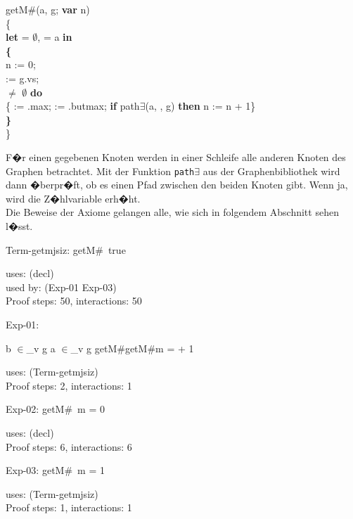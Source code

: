 \medskip

getM\#(a, g; {\bf var} n) \\
\{\\
{\bf let}  = $\emptyset$,  = a {\bf in}\\
{\bf \{}\\
\tabbe n := 0;\\
\tabbe {} := g.vs;\\
  $\neq$ $\emptyset$ {\bf do}\\
\tabbe {} \{ := .max;  := .butmax; {\bf if} path$\exists$(a, , g) {\bf then} n := n + 1\}\\
{\bf \}}\\
\}

F�r einen gegebenen Knoten werden in einer Schleife alle anderen Knoten des Graphen betrachtet. Mit der Funktion \texttt{path$\exists$} aus der Graphenbibliothek wird dann �berpr�ft, ob es einen Pfad zwischen den beiden Knoten gibt. Wenn ja, wird die Z�hlvariable erh�ht. \\
Die Beweise der Axiome gelangen alle, wie sich in folgendem Abschnitt sehen l�sst. 
\medskip

Term-getmjsiz: 
 \Fol \Do getM\#\Dc\ true


uses: (decl)\\
used by: (Exp-01 Exp-03)\\
Proof steps: 50, interactions: 50

\medskip

Exp-01: 
\begin{flushleft}


\Fol

\Not b $\in$\_v g \And a $\in$\_v g \Imp \Do getM\#\Dc \Do getM\#\Dc m =  + 1

\end{flushleft}


uses: (Term-getmjsiz)\\
Proof steps: 2, interactions: 1

\medskip

Exp-02: 
 \Fol \Do getM\#\Dc\ m = 0


uses: (decl)\\
Proof steps: 6, interactions: 6

\medskip

Exp-03: 
 \Fol \Do getM\#\Dc\ m = 1


uses: (Term-getmjsiz)\\
Proof steps: 1, interactions: 1

